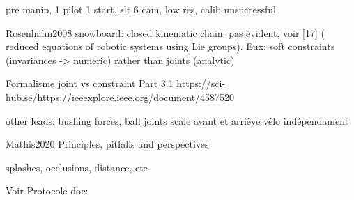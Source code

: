 pre manip, 1 pilot 1 start, slt 6 cam, low res, calib unsuccessful

Rosenhahn2008 snowboard: closed kinematic chain: pas évident, voir [17] ( reduced equations of robotic systems using Lie groups). Eux: soft constraints (invariances -> numeric) rather than joints (analytic)

Formalisme joint vs constraint Part 3.1 https://sci-hub.se/https://ieeexplore.ieee.org/document/4587520

other leads: bushing forces, ball joints
scale avant et arriève vélo indépendament





Mathis2020 Principles, pitfalls and perspectives

splashes, occlusions, distance, etc

Voir Protocole doc: %
